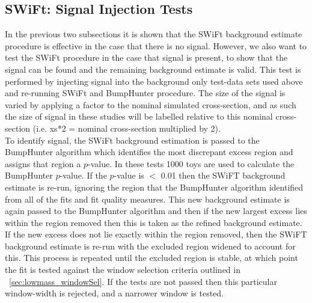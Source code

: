 \FloatBarrier

\subsection{SWiFt: Signal Injection Tests}
\label{sec:signalInj}


In the previous two subsections it is shown that the SWiFt background estimate procedure is effective in the case that there is no signal.
However, we also want to test the SWiFt procedure in the case that signal is present, to show that the signal can be found and the remaining background estimate is valid.
This test is performed by injecting signal into the background only test-data sets used above and re-running SWiFt and {\sc BumpHunter} procedure.
The size of the signal is varied by applying a factor to the nominal simulated cross-section,
and as such the size of signal in these studies will be labelled relative to this nominal cross-section (i.e. xs*2 = nominal cross-section multiplied by 2).\\

To identify signal,
the SWiFt background estimation is passed to the {\sc BumpHunter} algorithm which identifies the most discrepant excess region
and assigns that region a $p$-value.
In these tests 1000 toys are used to calculate the {\sc BumpHunter} $p$-value.
If the $p$-value is $<$ 0.01 then the SWiFT background estimate is re-run,
ignoring the region that the {\sc BumpHunter} algorithm identified from all of the fits and fit quality measures.
This new background estimate is again passed to the {\sc BumpHunter} algorithm and
then if the new largest excess lies within the region removed then this is taken as the refined background estimate.
If the new excess does not lie exactly within the region removed,
then the SWiFT background estimate is re-run
with the excluded region widened to account for this.
This process is repeated until the excluded region is stable,
at which point the fit is tested against the window selection
criteria outlined in ~\ref{sec:lowmass_windowSel}.
If the tests are not passed then this particular window-width is rejected, and a narrower window is tested. \\

